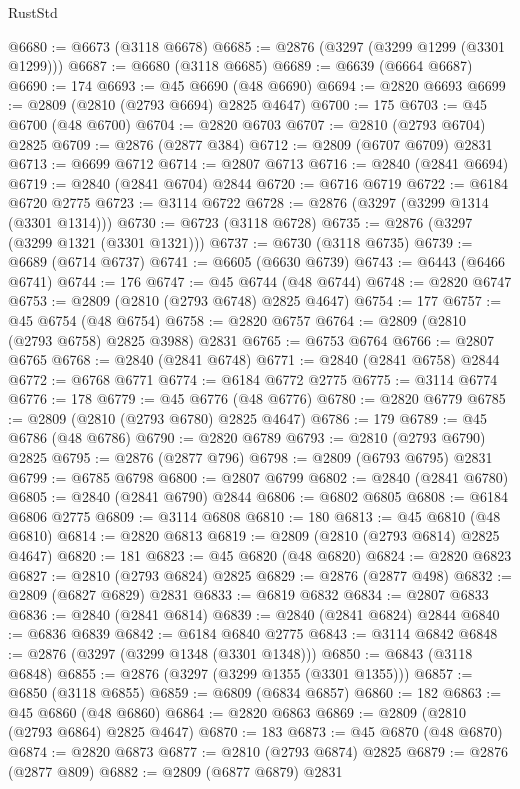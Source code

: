 \begin{lexlean}{RustStd}
\begin{coremodule}
@6680 := @6673 (@3118 @6678)
@6685 := @2876 (@3297 (@3299 @1299 (@3301 @1299)))
@6687 := @6680 (@3118 @6685)
@6689 := @6639 (@6664 @6687)
@6690 := 174
@6693 := @45 @6690 (@48 @6690)
@6694 := @2820 @6693
@6699 := @2809 (@2810 (@2793 @6694) @2825 @4647)
@6700 := 175
@6703 := @45 @6700 (@48 @6700)
@6704 := @2820 @6703
@6707 := @2810 (@2793 @6704) @2825
@6709 := @2876 (@2877 @384)
@6712 := @2809 (@6707 @6709) @2831
@6713 := @6699 @6712
@6714 := @2807 @6713
@6716 := @2840 (@2841 @6694)
@6719 := @2840 (@2841 @6704) @2844
@6720 := @6716 @6719
@6722 := @6184 @6720 @2775
@6723 := @3114 @6722
@6728 := @2876 (@3297 (@3299 @1314 (@3301 @1314)))
@6730 := @6723 (@3118 @6728)
@6735 := @2876 (@3297 (@3299 @1321 (@3301 @1321)))
@6737 := @6730 (@3118 @6735)
@6739 := @6689 (@6714 @6737)
@6741 := @6605 (@6630 @6739)
@6743 := @6443 (@6466 @6741)
@6744 := 176
@6747 := @45 @6744 (@48 @6744)
@6748 := @2820 @6747
@6753 := @2809 (@2810 (@2793 @6748) @2825 @4647)
@6754 := 177
@6757 := @45 @6754 (@48 @6754)
@6758 := @2820 @6757
@6764 := @2809 (@2810 (@2793 @6758) @2825 @3988) @2831
@6765 := @6753 @6764
@6766 := @2807 @6765
@6768 := @2840 (@2841 @6748)
@6771 := @2840 (@2841 @6758) @2844
@6772 := @6768 @6771
@6774 := @6184 @6772 @2775
@6775 := @3114 @6774
@6776 := 178
@6779 := @45 @6776 (@48 @6776)
@6780 := @2820 @6779
@6785 := @2809 (@2810 (@2793 @6780) @2825 @4647)
@6786 := 179
@6789 := @45 @6786 (@48 @6786)
@6790 := @2820 @6789
@6793 := @2810 (@2793 @6790) @2825
@6795 := @2876 (@2877 @796)
@6798 := @2809 (@6793 @6795) @2831
@6799 := @6785 @6798
@6800 := @2807 @6799
@6802 := @2840 (@2841 @6780)
@6805 := @2840 (@2841 @6790) @2844
@6806 := @6802 @6805
@6808 := @6184 @6806 @2775
@6809 := @3114 @6808
@6810 := 180
@6813 := @45 @6810 (@48 @6810)
@6814 := @2820 @6813
@6819 := @2809 (@2810 (@2793 @6814) @2825 @4647)
@6820 := 181
@6823 := @45 @6820 (@48 @6820)
@6824 := @2820 @6823
@6827 := @2810 (@2793 @6824) @2825
@6829 := @2876 (@2877 @498)
@6832 := @2809 (@6827 @6829) @2831
@6833 := @6819 @6832
@6834 := @2807 @6833
@6836 := @2840 (@2841 @6814)
@6839 := @2840 (@2841 @6824) @2844
@6840 := @6836 @6839
@6842 := @6184 @6840 @2775
@6843 := @3114 @6842
@6848 := @2876 (@3297 (@3299 @1348 (@3301 @1348)))
@6850 := @6843 (@3118 @6848)
@6855 := @2876 (@3297 (@3299 @1355 (@3301 @1355)))
@6857 := @6850 (@3118 @6855)
@6859 := @6809 (@6834 @6857)
@6860 := 182
@6863 := @45 @6860 (@48 @6860)
@6864 := @2820 @6863
@6869 := @2809 (@2810 (@2793 @6864) @2825 @4647)
@6870 := 183
@6873 := @45 @6870 (@48 @6870)
@6874 := @2820 @6873
@6877 := @2810 (@2793 @6874) @2825
@6879 := @2876 (@2877 @809)
@6882 := @2809 (@6877 @6879) @2831

\end{coremodule}
\end{lexlean}
